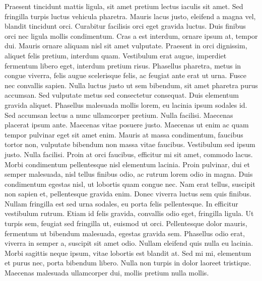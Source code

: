 Praesent tincidunt mattis ligula, sit amet pretium lectus iaculis sit amet. Sed
fringilla turpis luctus vehicula pharetra. Mauris lacus justo, eleifend a magna
vel, blandit tincidunt orci. Curabitur facilisis orci eget gravida luctus. Duis
finibus orci nec ligula mollis condimentum. Cras a est interdum, ornare ipsum
at, tempor dui. Mauris ornare aliquam nisl sit amet vulputate. Praesent in orci
dignissim, aliquet felis pretium, interdum quam. Vestibulum erat augue,
imperdiet fermentum libero eget, interdum pretium risus. Phasellus pharetra,
metus in congue viverra, felis augue scelerisque felis, ac feugiat ante erat ut
urna. Fusce nec convallis sapien.
Nulla luctus justo ut sem bibendum, sit amet pharetra purus accumsan. Sed
vulputate metus sed consectetur consequat. Duis elementum gravida aliquet.
Phasellus malesuada mollis lorem, eu lacinia ipsum sodales id. Sed accumsan
lectus a nunc ullamcorper pretium. Nulla facilisi. Maecenas placerat ipsum
ante. Maecenas vitae posuere justo. Maecenas ut enim ac quam tempor pulvinar
eget sit amet enim. Mauris at massa condimentum, faucibus tortor non, vulputate
bibendum non massa vitae faucibus. Vestibulum sed ipsum justo. Nulla facilisi.
Proin at orci faucibus, efficitur mi sit amet, commodo lacus. Morbi condimentum
pellentesque nisl elementum lacinia. Proin pulvinar, dui et semper malesuada,
nisl tellus finibus odio, ac rutrum lorem odio in magna. Duis condimentum
egestas nisl, ut lobortis quam congue nec. Nam erat tellus, suscipit non sapien
et, pellentesque gravida enim. Donec viverra luctus sem quis finibus. Nullam
fringilla est sed urna sodales, eu porta felis pellentesque. In efficitur
vestibulum rutrum. Etiam id felis gravida, convallis odio eget, fringilla
ligula. Ut turpis sem, feugiat sed fringilla ut, euismod ut orci. Pellentesque
dolor mauris, fermentum ut bibendum malesuada, egestas gravida sem.
Phasellus odio erat, viverra in semper a, suscipit sit amet odio. Nullam
eleifend quis nulla eu lacinia. Morbi sagittis neque ipsum, vitae lobortis est
blandit at. Sed mi mi, elementum et purus nec, porta bibendum libero. Nulla non
turpis in dolor laoreet tristique. Maecenas malesuada ullamcorper dui, mollis
pretium nulla mollis. 
